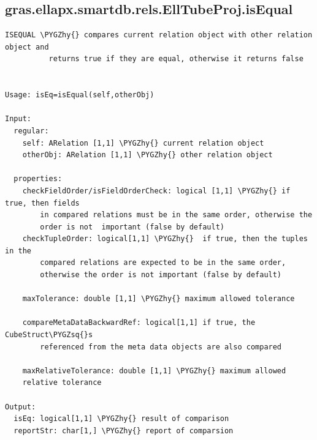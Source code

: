 \documentclass[letterpaper,10pt,english]{sphinxmanual}
\def\PYGZhy{\char`\-}
\def\PYGZsq{\char`\'}
\begin{document}
\subsection{gras.ellapx.smartdb.rels.EllTubeProj.isEqual}
\label{chap_functions:gras-ellapx-smartdb-rels-elltubeproj-isequal}
\begin{Verbatim}[commandchars=\\\{\}]
ISEQUAL \PYGZhy{} compares current relation object with other relation object and
          returns true if they are equal, otherwise it returns false


Usage: isEq=isEqual(self,otherObj)

Input:
  regular:
    self: ARelation [1,1] \PYGZhy{} current relation object
    otherObj: ARelation [1,1] \PYGZhy{} other relation object

  properties:
    checkFieldOrder/isFieldOrderCheck: logical [1,1] \PYGZhy{} if true, then fields
        in compared relations must be in the same order, otherwise the
        order is not  important (false by default)
    checkTupleOrder: logical[1,1] \PYGZhy{}  if true, then the tuples in the
        compared relations are expected to be in the same order,
        otherwise the order is not important (false by default)

    maxTolerance: double [1,1] \PYGZhy{} maximum allowed tolerance

    compareMetaDataBackwardRef: logical[1,1] if true, the CubeStruct\PYGZsq{}s
        referenced from the meta data objects are also compared

    maxRelativeTolerance: double [1,1] \PYGZhy{} maximum allowed
    relative tolerance

Output:
  isEq: logical[1,1] \PYGZhy{} result of comparison
  reportStr: char[1,] \PYGZhy{} report of comparsion
\end{Verbatim}
\end{document}
